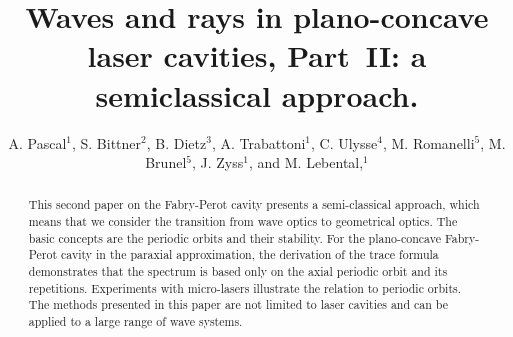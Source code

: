 \documentclass[10pt]{iopart}
\begin{document}
\title{Waves and rays in plano-concave laser cavities, Part~II: a semiclassical approach.}

\author{A. Pascal$^{1}$, S. Bittner$^{2}$, B. Dietz$^{3}$, A. Trabattoni$^{1}$, C. Ulysse$^{4}$, M. Romanelli$^{5}$, M. Brunel$^{5}$,  J. Zyss$^{1}$, and M. Lebental,$^{1}$}


\address{$^{1}$ Laboratoire de Photonique Quantique et Mol\'eculaire, CNRS UMR 8537, Institut d'Alembert FR 3242, Ecole Normale Sup\'erieure de Cachan, Universit\'e Paris-Saclay, F-94235 Cachan, France.}
\address{$^{2}$ Department of Applied Physics, Yale University, New Haven, Connecticut 06520, USA.}
\address{$^{3}$ School of Physical Science and Technology, and Key Laboratory for Magnetism and Magnetic Materials of MOE, Lanzhou University, Lanzhou, Gansu 730000, China.}
\address{$^{4}$ Centre de Nanosciences et de Nanotechnologies, Universit\'e Paris-Saclay, F-91460 Marcoussis, France.}
\address{$^{5}$ Institut de Physique de Rennes, Universit\'e Rennes I - CNRS UMR 6251,
Campus de Beaulieu, 35042 Rennes Cedex, France.}



\begin{abstract}
This second paper on the Fabry-Perot cavity presents a semi-classical approach, which means that we consider the transition from wave optics to geometrical optics. The basic concepts are the periodic orbits and their stability. For the plano-concave Fabry-Perot cavity in the paraxial approximation, the derivation of the trace formula demonstrates that the spectrum is based only on the axial periodic orbit and its repetitions. Experiments with micro-lasers illustrate the relation to periodic orbits. The methods presented in this paper are not limited to laser cavities and can be applied to a large range of wave systems.
\end{abstract}

\pacs{} %
\submitto{\EJP}
\end{document}
